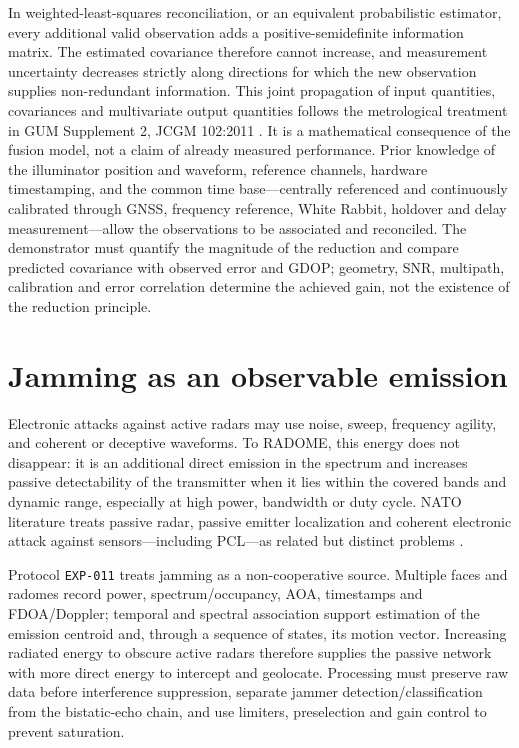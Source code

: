 In weighted-least-squares reconciliation, or an equivalent probabilistic estimator, every additional valid observation adds a positive-semidefinite information matrix. The estimated covariance therefore cannot increase, and measurement uncertainty decreases strictly along directions for which the new observation supplies non-redundant information. This joint propagation of input quantities, covariances and multivariate output quantities follows the metrological treatment in GUM Supplement 2, JCGM 102:2011 \citep{jcgm1022011}. It is a mathematical consequence of the fusion model, not a claim of already measured performance. Prior knowledge of the illuminator position and waveform, reference channels, hardware timestamping, and the common time base---centrally referenced and continuously calibrated through GNSS, frequency reference, White Rabbit, holdover and delay measurement---allow the observations to be associated and reconciled. The demonstrator must quantify the magnitude of the reduction and compare predicted covariance with observed error and GDOP; geometry, SNR, multipath, calibration and error correlation determine the achieved gain, not the existence of the reduction principle.

\section{Jamming as an observable emission}
Electronic attacks against active radars may use noise, sweep, frequency agility, and coherent or deceptive waveforms. To RADOME, this energy does not disappear: it is an additional direct emission in the spectrum and increases passive detectability of the transmitter when it lies within the covered bands and dynamic range, especially at high power, bandwidth or duty cycle. NATO literature treats passive radar, passive emitter localization and coherent electronic attack against sensors---including PCL---as related but distinct problems \citep{nato2019passiveradar,nato2017coherentea}.

Protocol \texttt{EXP-011} treats jamming as a non-cooperative source. Multiple faces and radomes record power, spectrum/occupancy, AOA, timestamps and FDOA/Doppler; temporal and spectral association support estimation of the emission centroid and, through a sequence of states, its motion vector. Increasing radiated energy to obscure active radars therefore supplies the passive network with more direct energy to intercept and geolocate. Processing must preserve raw data before interference suppression, separate jammer detection/classification from the bistatic-echo chain, and use limiters, preselection and gain control to prevent saturation.

